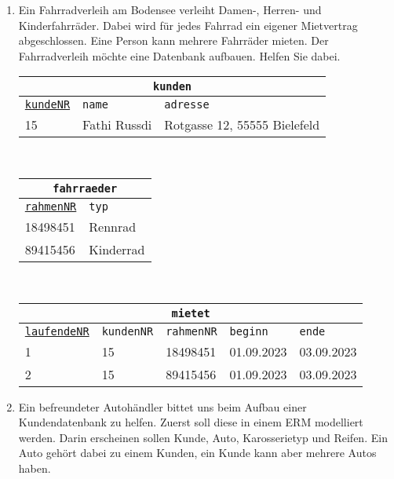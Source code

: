 \begin{Answer}[ref=TabelleErstellen1]
	\begin{enumerate}
		\item Ein Fahrradverleih am Bodensee verleiht Damen-, Herren- und Kinderfahrräder. Dabei wird für jedes Fahrrad ein eigener Mietvertrag abgeschlossen. Eine Person kann mehrere Fahrräder mieten. Der Fahrradverleih möchte eine Datenbank aufbauen. Helfen Sie dabei.\\
		\begin{tabular}{lll}
			\multicolumn{3}{c}{\lstinline!kunden!}\\
			\hline
			\underline{\lstinline!kundeNR!}&\lstinline!name!&\lstinline!adresse!\\
			\hline
			15&Fathi Russdi&Rotgasse 12, 55555 Bielefeld\\
		\end{tabular}\\
		\begin{tabular}{ll}
			\multicolumn{2}{c}{\lstinline!fahrraeder!}\\
			\hline
			\underline{\lstinline!rahmenNR!}&\lstinline!typ!\\
			\hline
			18498451&Rennrad\\
			89415456&Kinderrad\\
		\end{tabular}\\
		\begin{tabular}{lllll}
			\multicolumn{5}{c}{\lstinline!mietet!}\\
			\hline
			\underline{\lstinline!laufendeNR!}&\lstinline!kundenNR!&\lstinline!rahmenNR!&\lstinline!beginn!&\lstinline!ende!\\
			\hline
			1&15&18498451&01.09.2023&03.09.2023\\
			2&15&89415456&01.09.2023&03.09.2023\\
		\end{tabular}

		\item Ein befreundeter Autohändler bittet uns beim Aufbau einer Kundendatenbank zu helfen. Zuerst soll diese in einem ERM modelliert werden. Darin erscheinen sollen Kunde, Auto, Karosserietyp und Reifen. Ein Auto gehört dabei zu einem Kunden, ein Kunde kann aber mehrere Autos haben.


\end{enumerate}
\end{Answer}
